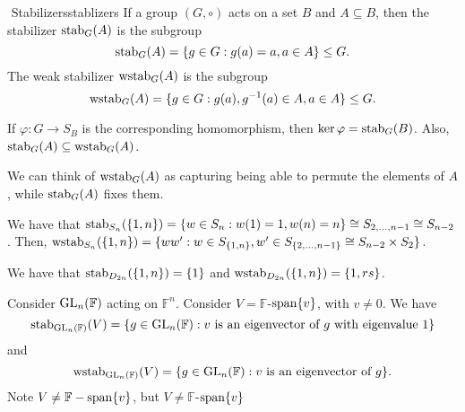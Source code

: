         \begin{definition}{\Stop\,\,Stabilizers}{stablizers}
            If a group \((G,\circ)\) acts on a set \(B\) and \(A\subseteq B\), then the stabilizer \(\operatorname{stab}_G(A)\) is the subgroup
            \begin{equation*}
                \operatorname{stab}_G(A)=\{g\in G:g(a)=a,a\in A\}\leq G.
            \end{equation*}
            The weak stabilizer \(\operatorname{wstab}_G(A)\) is the subgroup
            \begin{equation*}
                \operatorname{wstab}_G(A)=\{g\in G:g(a),g^{-1}(a)\in A,a\in A\}\leq G.
            \end{equation*}
        \end{definition}
        \begin{remark*}
            If \(\varphi:G\to S_B\) is the corresponding homomorphism, then \(\ker\varphi=\operatorname{stab}_G(B)\). Also, \(\operatorname{stab}_G(A)\subseteq\operatorname{wstab}_G(A)\).
        \end{remark*}
        \begin{remark*}
            We can think of \(\operatorname{wstab}_G(A)\) as capturing being able to permute the elements of \(A\), while \(\operatorname{stab}_G(A)\) fixes them.
        \end{remark*}
        \begin{example}
            We have that \(\operatorname{stab}_{S_n}(\{1,n\})=\{w\in S_n: w(1)=1, w(n)=n\}\cong S_{2,\ldots,n-1}\cong S_{n-2}\). Then, \(\operatorname{wstab}_{S_n}(\{1,n\})=\{ww':w\in S_{\{1,n\}}, w'\in S_{\{2,\ldots,n-1\}}\cong S_{n-2}\times S_2\}\).
        \end{example}
        \begin{example}
            We have that \(\operatorname{stab}_{D_{2n}}(\{1,n\})=\{1\}\) and \(\operatorname{wstab}_{D_{2n}}(\{1,n\})=\{1, rs\}\).
        \end{example}
        \begin{example}
            Consider \(\operatorname{GL}_n(\mathbb{F})\) acting on \(\mathbb{F}^n\). Consider \(V=\mathbb{F}\)-\(\operatorname{span}\{v\}\), with \(v\neq0\). We have
            \begin{equation*}
                \operatorname{stab}_{\operatorname{GL}_n(\mathbb{F})}(V)=\{g\in \operatorname{GL}_n(\mathbb{F}):v\text{ is an eigenvector of }g\text{ with eigenvalue }1\}
            \end{equation*}
            and
            \begin{equation*}
                \operatorname{wstab}_{\operatorname{GL}_n(\mathbb{F})}(V)=\{g\in \operatorname{GL}_n(\mathbb{F}):v\text{ is an eigenvector of }g\}.
            \end{equation*}
            Note \(V\neq\mathbb{F}-\operatorname{span}\{v\}\), but \(V\neq\mathbb{F}\)-\(\operatorname{span}\{v\}\)
        \end{example}

